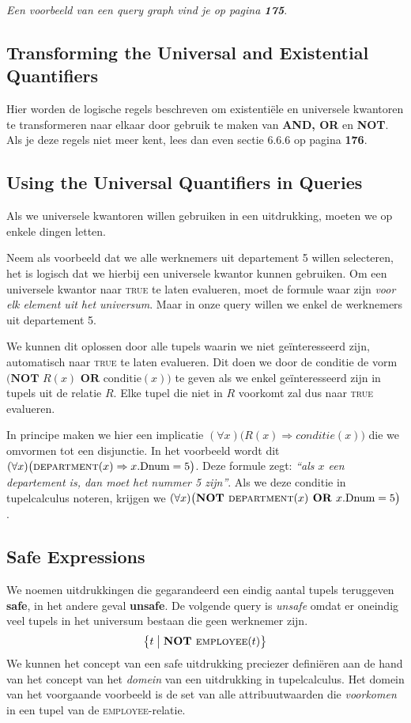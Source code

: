 \textit{Een voorbeeld van een query graph vind je op pagina \textbf{175}}.


\subsection{Transforming the Universal and Existential Quantifiers}
Hier worden de logische regels beschreven om existenti\"ele en universele kwantoren te transformeren naar elkaar door gebruik te maken van \textbf{AND, OR} en \textbf{NOT}. Als je deze regels niet meer kent, lees dan even sectie 6.6.6 op pagina \textbf{176}.


\subsection{Using the Universal Quantifiers in Queries}
Als we universele kwantoren willen gebruiken in een uitdrukking, moeten we op enkele dingen letten.

Neem als voorbeeld dat we alle werknemers uit departement 5 willen selecteren, het is logisch dat we hierbij een universele kwantor kunnen gebruiken. Om een universele kwantor naar \textsc{true} te laten evalueren, moet de formule waar zijn \textit{voor elk element uit het universum}. Maar in onze query willen we enkel de werknemers uit departement 5.

We kunnen dit oplossen door alle tupels waarin we niet ge\"interesseerd zijn, automatisch naar \textsc{true} te laten evalueren. Dit doen we door de conditie de vorm $\big(\textbf{NOT } R(x) \textbf{ OR } \text{conditie}(x) \big)$ te geven als we enkel ge\"interesseerd zijn in tupels uit de relatie $R$. Elke tupel die niet in $R$ voorkomt zal dus naar \textsc{true} evalueren.

In principe maken we hier een implicatie $(\forall x)\big( R(x) \Rightarrow \textit{conditie}(x) \big)$ die we omvormen tot een disjunctie. In het voorbeeld wordt dit $(\forall x)\big( \textsc{department}(x) \Rightarrow x.\text{Dnum}=5 \big)$. Deze formule zegt: \textit{``als $x$ een departement is, dan moet het nummer 5 zijn''}. Als we deze conditie in tupelcalculus noteren, krijgen we $(\forall x)\big( \textbf{NOT } \textsc{department}(x) \textbf{ OR } x.\text{Dnum}=5 \big)$.


\subsection{Safe Expressions}
We noemen uitdrukkingen die gegarandeerd een eindig aantal tupels teruggeven \textbf{safe}, in het andere geval \textbf{unsafe}. De volgende query is \textit{unsafe} omdat er oneindig veel tupels in het universum bestaan die geen werknemer zijn.
\vspace{-2mm}
\[ \big\{ t \bigm| \textbf{NOT } \textsc{employee}(t) \big\} \]
We kunnen het concept van een safe uitdrukking preciezer defini\"eren aan de hand van het concept van het \textit{domein} van een uitdrukking in tupelcalculus. Het domein van het voorgaande voorbeeld is de set van alle attribuutwaarden die \textit{voorkomen} in een tupel van de \textsc{employee}-relatie.

